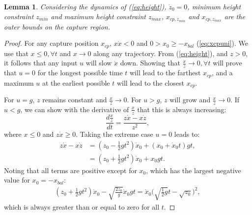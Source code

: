 \documentclass[letterpaper, 10 pt, conference]{ieeeconf}  %
\newcommand{\zmin}{z_{min}}
\newcommand{\zmax}{z_{max}}
\newtheorem{lem}{Lemma}
\begin{document}
\begin{lem}\label{lem:regionz}
Considering the dynamics of (\ref{eq:height}), $\dot{z}_0=0$, minimum height constraint $\zmin$ and maximum height constraint $\zmax$, $x_{cp,\zmin}$ and $x_{cp,\zmax}$ are the outer bounds on the capture region.
\end{lem}
\begin{proof}
For any capture position $x_{cp}$, $x\dot{x}<0$ \cite{koolen2016balance} and $0>x_0\geq-x_{bal}$ (\ref{eq:xcpuni}). 
We use that $x \leq 0, \forall t$ and $x\rightarrow 0$ along any trajectory. From (\ref{eq:height}), and $z>0$, it follows that any input $u$ will slow $\dot{x}$ down. Showing that $\frac{x}{z}\rightarrow 0, \forall t$ will prove that $u=0$ for the longest possible time $t$ will lead to the farthest $x_{cp}$, and a maximum $u$ at the earliest possible $t$ will lead to the closest $x_{cp}$. 

For $u=g$, $z$ remains constant and $\frac{x}{z}\rightarrow 0$. For $u>g$, $z$ will grow and $\frac{x}{z}\rightarrow 0$. If $u<g$, we can show with the derivative of $\frac{x}{z}$ that this is always increasing:
\begin{equation}
\frac{d\frac{x}{z}}{dt}= \frac{z\dot{x}-x\dot{z}}{z^2},
\end{equation}
where $x \leq 0$ and $z \dot{x} \geq 0$. Taking the extreme case $u=0$ leads to:
\begin{align}
	z\dot{x}-x\dot{z} &= (z_0 - \frac{1}{2}gt^2)\dot{x}_0 + (x_0 + \dot{x}_0 t)gt,\\
	&= (z_0 +\frac{1}{2}gt^2)\dot{x}_0 + x_0gt.
\end{align}
Noting that all terms are positive except for $x_0$, which has the largest negative value for $x_0=-x_{bal}$:
\begin{align}
	(z_0 +\frac{1}{2}gt^2)\dot{x}_0 - \sqrt{\frac{2z_0}{g}}\dot{x}_0gt = \dot{x}_0\bigg(\sqrt{\frac{1}{2}g}t - \sqrt{z_0}\bigg)^2,
\end{align}
which is always greater than or equal to zero for all $t$.
\end{proof}
\end{document}
